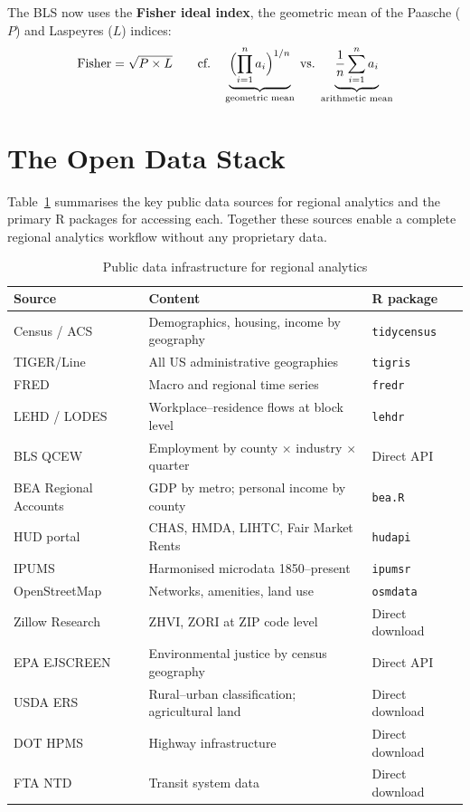The BLS now uses the \textbf{Fisher ideal index},
the geometric mean of the Paasche ($P$) and Laspeyres ($L$) indices:
\begin{equation}
  \text{Fisher} = \sqrt{P \times L}
  \qquad\text{cf.}\quad
  \underbrace{\Bigl(\prod_{i=1}^{n}a_i\Bigr)^{1/n}}_{\text{geometric mean}}
  \;\text{vs.}\;
  \underbrace{\frac{1}{n}\sum_{i=1}^{n}a_i}_{\text{arithmetic mean}}
\end{equation}


\section{The Open Data Stack}
\label{sec_OpenData}

Table~\ref{tbl_OpenData} summarises the key public data sources for regional
analytics and the primary R packages for accessing each. Together these
sources enable a complete regional analytics workflow without any proprietary
data.

\begin{table}[htp]
\centering
\caption{Public data infrastructure for regional analytics}
\label{tbl_OpenData}
\renewcommand{\arraystretch}{1.4}
\begin{tabular}{@{}p{3.8cm}p{5.5cm}p{3cm}@{}}
\toprule
\textbf{Source} & \textbf{Content} & \textbf{R package} \\
\midrule
Census / ACS & Demographics, housing, income by geography & \texttt{tidycensus} \\
TIGER/Line & All US administrative geographies & \texttt{tigris} \\
FRED & Macro and regional time series & \texttt{fredr} \\
LEHD / LODES & Workplace--residence flows at block level & \texttt{lehdr} \\
BLS QCEW & Employment by county $\times$ industry $\times$ quarter & Direct API \\
BEA Regional Accounts & GDP by metro; personal income by county & \texttt{bea.R} \\
HUD portal & CHAS, HMDA, LIHTC, Fair Market Rents & \texttt{hudapi} \\
IPUMS & Harmonised microdata 1850--present & \texttt{ipumsr} \\
OpenStreetMap & Networks, amenities, land use & \texttt{osmdata} \\
Zillow Research & ZHVI, ZORI at ZIP code level & Direct download \\
EPA EJSCREEN & Environmental justice by census geography & Direct API \\
USDA ERS & Rural--urban classification; agricultural land & Direct download \\
DOT HPMS & Highway infrastructure & Direct download \\
FTA NTD & Transit system data & Direct download \\
\bottomrule
\end{tabular}
\renewcommand{\arraystretch}{1}
\end{table}

